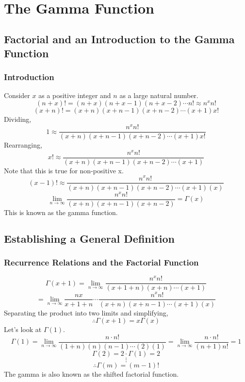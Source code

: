 \documentclass[../main.tex]{subfiles}
\begin{document}
\chapter{The Gamma Function}

\section{Factorial and an Introduction to the Gamma Function}
    \subsection{Introduction}
        Consider $x$ as a positive integer and $n$ as a large natural number.
        $$(n+x)!=(n+x)(n+x-1)(n+x-2)\cdots n!\approx n^{x}n!$$
        $$(x+n)!=(x+n)(x+n-1)(x+n-2)\cdots(x+1)x!$$
        Dividing,
        $$1\approx\frac{n^{x}n!}{(x+n)(x+n-1)(x+n-2)\cdots(x+1)x!}$$
        Rearranging,
        $$x!\approx\frac{n^{x}n!}{(x+n)(x+n-1)(x+n-2)\cdots(x+1)}$$
        Note that this is true for non-positive x.
        $$(x-1)!\approx\frac{n^{x}n!}{(x+n)(x+n-1)(x+n-2)\cdots(x+1)(x)}$$
        $$\lim_{n\rightarrow \infty}\frac{n^{x}n!}{(x+n)(x+n-1)(x+n-2)}=\Gamma(x)$$
        This is known as the gamma function.

\section{Establishing a General Definition}
    \subsection{Recurrence Relations and the Factorial Function}
        $$\Gamma(x+1)=\lim_{n\rightarrow \infty}\frac{n^{x}n!}{(x+1+n)(x+n)\cdots (x+1)}$$
        $$=\lim_{n\rightarrow \infty}\frac{nx}{x+1+n}\cdots\frac{n^{x}n!}{(x+n)(x+n-1)\cdots (x+1)(x)}$$
        Separating the product into two limits and simplifying,
        $$\boxed{\therefore \Gamma(x+1)=x\Gamma(x)}$$
        Let's look at $\Gamma(1)$.
        $$\Gamma(1)=\lim_{n\rightarrow\infty}\frac{n\cdot n!}{(1+n)(n)(n-1)\cdots(2)(1)}=\lim_{n\rightarrow\infty}\frac{n\cdot n!}{(n+1)n!}=1$$
        $$\Gamma(2)=2\cdot\Gamma(1)=2$$
        $$\vdots$$
        $$\boxed{\therefore \Gamma(m)=(m-1)!}$$
        The gamma is also known as the shifted factorial function.
    
\end{document}
